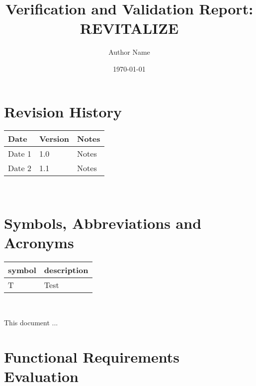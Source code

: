 \documentclass[12pt, titlepage]{article}
\begin{document}
\title{Verification and Validation Report: REVITALIZE} 
\author{Author Name}
\date{\today}

\maketitle


\section{Revision History}

\begin{tabularx}{\textwidth}{p{3cm}p{2cm}X}
	\toprule {\bf Date} & {\bf Version} & {\bf Notes}\\
	\midrule
	Date 1 & 1.0 & Notes\\
	Date 2 & 1.1 & Notes\\
	\bottomrule
\end{tabularx}

~\newpage

\section{Symbols, Abbreviations and Acronyms}

\renewcommand{\arraystretch}{1.2}
\begin{tabular}{l l} 
	\toprule		
	\textbf{symbol} & \textbf{description}\\
	\midrule 
	T & Test\\
	\bottomrule
\end{tabular}\\


\newpage

\tableofcontents

\listoftables %

\listoffigures %

\newpage


This document ...

\section{Functional Requirements Evaluation}
\end{document}
